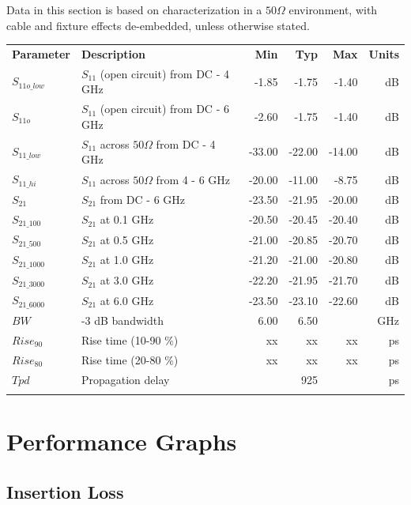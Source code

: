 \documentclass[11pt]{article}
\newcommand{\thinhline}{\Xhline{1\arrayrulewidth}}
\newcommand{\thickhline}{\Xhline{2.5\arrayrulewidth}}
\begin{document}
Data in this section is based on characterization in a $50 \Omega$ environment, with cable and fixture effects
de-embedded, unless otherwise stated.

\begin{tabularx}{16cm}{lXrrrr}
\thickhline
\textbf{Parameter} & \textbf{Description} & \textbf{Min} & \textbf{Typ} & \textbf{Max} & \textbf{Units} \\
\thickhline
$S_{11o\_low}$ & $S_{11}$ (open circuit) from DC - 4 GHz & -1.85 & -1.75 & -1.40 & dB \\
\thinhline
$S_{11o}$ & $S_{11}$ (open circuit) from DC - 6 GHz & -2.60 & -1.75 & -1.40 & dB \\
\thinhline
$S_{11\_low}$ & $S_{11}$ across $50\Omega$ from DC - 4 GHz & -33.00 & -22.00 & -14.00 & dB \\
\thinhline
$S_{11\_hi}$ & $S_{11}$ across $50\Omega$ from 4 - 6 GHz & -20.00 & -11.00 & -8.75 & dB \\
\thinhline
$S_{21}$ & $S_{21}$ from DC - 6 GHz & -23.50 & -21.95 & -20.00 & dB \\
\thinhline
$S_{21\_100}$ & $S_{21}$ at 0.1 GHz & -20.50 & -20.45 & -20.40 & dB \\
\thinhline
$S_{21\_500}$ & $S_{21}$ at 0.5 GHz & -21.00 & -20.85 & -20.70 & dB \\
\thinhline
$S_{21\_1000}$ & $S_{21}$ at 1.0 GHz & -21.20 & -21.00 & -20.80 & dB \\
\thinhline
$S_{21\_3000}$ & $S_{21}$ at 3.0 GHz & -22.20 & -21.95 & -21.70 & dB \\
\thinhline
$S_{21\_6000}$ & $S_{21}$ at 6.0 GHz & -23.50 & -23.10 & -22.60 & dB \\
\thinhline
$BW$ & -3 dB bandwidth & 6.00 & 6.50 & & GHz \\
\thinhline
$Rise_{90}$ & Rise time (10-90 \%) & xx & xx & xx & ps \\
\thinhline
$Rise_{80}$ & Rise time (20-80 \%) & xx & xx & xx & ps \\
\thinhline
$Tpd$ & Propagation delay &  & 925 &  & ps \\
\thickhline
\end{tabularx}

\pagebreak
\section{Performance Graphs}

\subsection{Insertion Loss}
\end{document}
